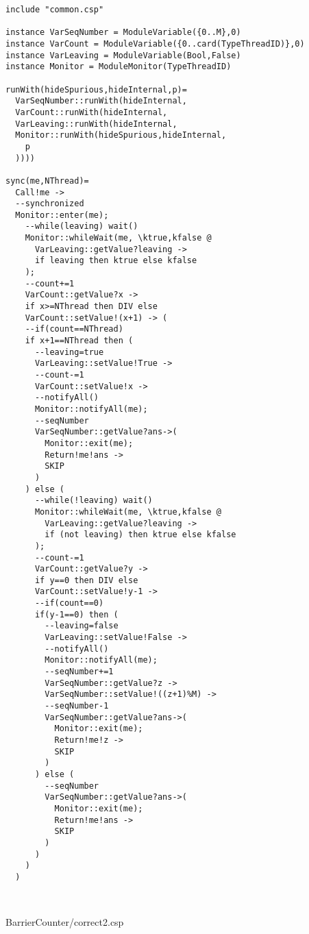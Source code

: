 \begin{lstlisting}
include "common.csp"

instance VarSeqNumber = ModuleVariable({0..M},0)
instance VarCount = ModuleVariable({0..card(TypeThreadID)},0)
instance VarLeaving = ModuleVariable(Bool,False)
instance Monitor = ModuleMonitor(TypeThreadID)

runWith(hideSpurious,hideInternal,p)=
  VarSeqNumber::runWith(hideInternal,
  VarCount::runWith(hideInternal,
  VarLeaving::runWith(hideInternal,
  Monitor::runWith(hideSpurious,hideInternal,
    p
  ))))

sync(me,NThread)=
  Call!me ->
  --synchronized
  Monitor::enter(me);
    --while(leaving) wait()
    Monitor::whileWait(me, \ktrue,kfalse @
      VarLeaving::getValue?leaving ->
      if leaving then ktrue else kfalse
    );
    --count+=1
    VarCount::getValue?x ->
    if x>=NThread then DIV else
    VarCount::setValue!(x+1) -> (
    --if(count==NThread)
    if x+1==NThread then (
      --leaving=true
      VarLeaving::setValue!True ->
      --count-=1
      VarCount::setValue!x ->
      --notifyAll()
      Monitor::notifyAll(me);
      --seqNumber
      VarSeqNumber::getValue?ans->(
        Monitor::exit(me);
        Return!me!ans ->
        SKIP
      )
    ) else (
      --while(!leaving) wait()
      Monitor::whileWait(me, \ktrue,kfalse @
        VarLeaving::getValue?leaving ->
        if (not leaving) then ktrue else kfalse
      );
      --count-=1
      VarCount::getValue?y -> 
      if y==0 then DIV else
      VarCount::setValue!y-1 ->
      --if(count==0)
      if(y-1==0) then (
        --leaving=false
        VarLeaving::setValue!False ->
        --notifyAll()
        Monitor::notifyAll(me);
        --seqNumber+=1
        VarSeqNumber::getValue?z ->
        VarSeqNumber::setValue!((z+1)%M) ->
        --seqNumber-1
        VarSeqNumber::getValue?ans->(
          Monitor::exit(me);
          Return!me!z ->
          SKIP
        )
      ) else (
        --seqNumber
        VarSeqNumber::getValue?ans->(
          Monitor::exit(me);
          Return!me!ans ->
          SKIP
        )
      )
    )
  )



\end{lstlisting}
BarrierCounter/correct2.csp
